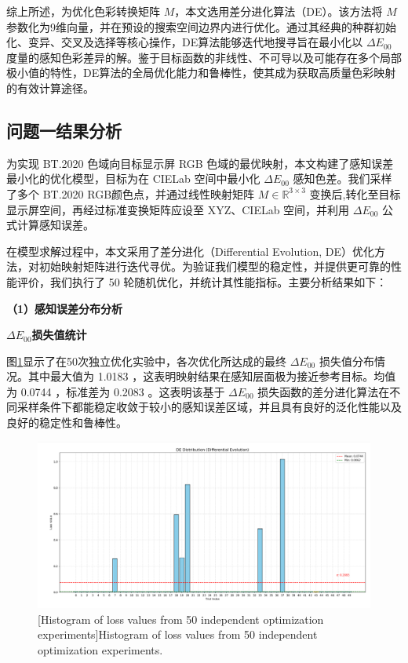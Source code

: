 综上所述，为优化色彩转换矩阵 $M$，本文选用差分进化算法（DE）。该方法将 $M$ 参数化为9维向量，并在预设的搜索空间边界内进行优化。通过其经典的种群初始化、变异、交叉及选择等核心操作，DE算法能够迭代地搜寻旨在最小化以 $\Delta E_{00}$ 度量的感知色彩差异的解。鉴于目标函数的非线性、不可导以及可能存在多个局部极小值的特性，DE算法的全局优化能力和鲁棒性，使其成为获取高质量色彩映射的有效计算途径。

\subsection[\hspace{-2pt}问题一结果分析]{{\heiti{} \hspace{-8pt}问题一结果分析}}\label{section4: 问题一结果分析}

为实现 BT.2020 色域向目标显示屏 RGB 色域的最优映射，本文构建了感知误差最小化的优化模型，目标为在 CIELab 空间中最小化 $\Delta E_{00}$ 感知色差。我们采样了多个 BT.2020 RGB颜色点，并通过线性映射矩阵 $M\in \mathbb{R}^{3\times 3}$ 变换后,转化至目标显示屏空间，再经过标准变换矩阵应设至 XYZ、CIELab 空间，并利用 $\Delta E_{00}$ 公式计算感知误差。

在模型求解过程中，本文采用了差分进化（Differential Evolution, DE）优化方法，对初始映射矩阵进行迭代寻优。为验证我们模型的稳定性，并提供更可靠的性能评价，我们执行了 50 轮随机优化，并统计其性能指标。主要分析结果如下：

\noindent\textbf{（1）感知误差分布分析}

 \textbf{$\Delta E_{00}$损失值统计}

图\ref{figure3: 柱状loss}显示了在50次独立优化实验中，各次优化所达成的最终 $\Delta E_{00}$ 损失值分布情况。其中最大值为 1.0183 ，这表明映射结果在感知层面极为接近参考目标。均值为 0.0744 ，标准差为 0.2083 。这表明该基于 $\Delta E_{00}$ 损失函数的差分进化算法在不同采样条件下都能稳定收敛于较小的感知误差区域，并且具有良好的泛化性能以及良好的稳定性和鲁棒性。

\begin{figure}[h]
\centering
{}
\includegraphics[width=1.0\columnwidth]{figures/DE2000.png}
[Histogram of loss values from 50 independent optimization experiments]{Histogram of loss values from 50 independent optimization experiments.}
\label{figure3: 柱状loss}
\end{figure}

